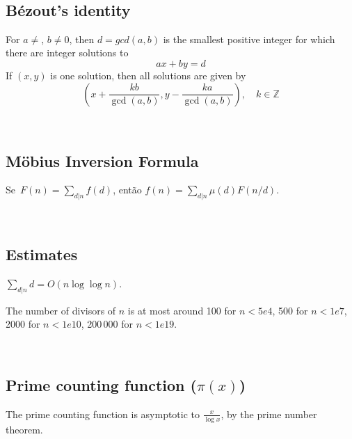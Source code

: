 \


\subsection{Bézout's identity}
For $a \neq $, $b \neq 0$, then $d=gcd(a,b)$ is the smallest positive integer for which there are integer solutions to
$$ax+by=d$$
If $(x,y)$ is one solution, then all solutions are given by
$$\left(x+\frac{kb}{\gcd(a,b)}, y-\frac{ka}{\gcd(a,b)}\right), \quad k\in\mathbb{Z}$$


\


\subsection{Möbius Inversion Formula}
    Se~$F(n) = \sum\limits_{d | n}{f(d)}$, então
    $f(n) = \sum\limits_{d | n}{\mu(d) F(n / d)}.$
  

\


\subsection{Estimates}
	$\sum_{d|n} d = O(n \log \log n)$.

	The number of divisors of $n$ is at most around 100 for $n < 5e4$, 500 for $n < 1e7$, 2000 for $n < 1e10$, 200\,000 for $n < 1e19$.


\

	
 \subsection{Prime counting function ($\pi(x)$)} The prime counting function is asymptotic to $\frac{x}{\log x}$, by the prime number theorem.

      
